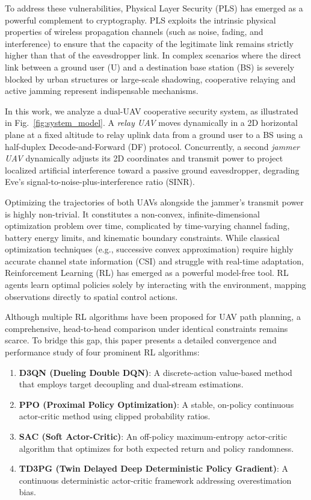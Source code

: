 \documentclass[journal,onecolumn]{IEEEtran}
\begin{document}
To address these vulnerabilities, Physical Layer Security (PLS) has emerged as a powerful complement to cryptography. PLS exploits the intrinsic physical properties of wireless propagation channels (such as noise, fading, and interference) to ensure that the capacity of the legitimate link remains strictly higher than that of the eavesdropper link. In complex scenarios where the direct link between a ground user (U) and a destination base station (BS) is severely blocked by urban structures or large-scale shadowing, cooperative relaying and active jamming represent indispensable mechanisms.

In this work, we analyze a dual-UAV cooperative security system, as illustrated in Fig.~\ref{fig:system_model}. A \textit{relay UAV} moves dynamically in a 2D horizontal plane at a fixed altitude to relay uplink data from a ground user to a BS using a half-duplex Decode-and-Forward (DF) protocol. Concurrently, a second \textit{jammer UAV} dynamically adjusts its 2D coordinates and transmit power to project localized artificial interference toward a passive ground eavesdropper, degrading Eve's signal-to-noise-plus-interference ratio (SINR).

Optimizing the trajectories of both UAVs alongside the jammer's transmit power is highly non-trivial. It constitutes a non-convex, infinite-dimensional optimization problem over time, complicated by time-varying channel fading, battery energy limits, and kinematic boundary constraints. While classical optimization techniques (e.g., successive convex approximation) require highly accurate channel state information (CSI) and struggle with real-time adaptation, Reinforcement Learning (RL) has emerged as a powerful model-free tool. RL agents learn optimal policies solely by interacting with the environment, mapping observations directly to spatial control actions.

Although multiple RL algorithms have been proposed for UAV path planning, a comprehensive, head-to-head comparison under identical constraints remains scarce. To bridge this gap, this paper presents a detailed convergence and performance study of four prominent RL algorithms:
\begin{enumerate}
    \item \textbf{D3QN (Dueling Double DQN)}: A discrete-action value-based method that employs target decoupling and dual-stream estimations.
    \item \textbf{PPO (Proximal Policy Optimization)}: A stable, on-policy continuous actor-critic method using clipped probability ratios.
    \item \textbf{SAC (Soft Actor-Critic)}: An off-policy maximum-entropy actor-critic algorithm that optimizes for both expected return and policy randomness.
    \item \textbf{TD3PG (Twin Delayed Deep Deterministic Policy Gradient)}: A continuous deterministic actor-critic framework addressing overestimation bias.
\end{enumerate}
\end{document}
